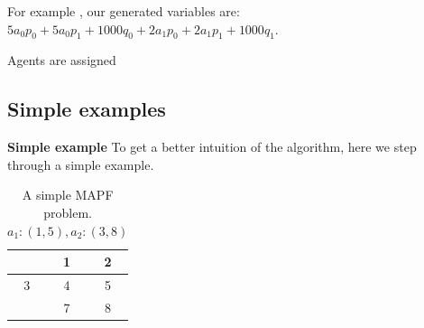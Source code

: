 \documentclass[a4paper,11pt]{article}
\begin{document}
For example \cite{put example!}, our generated variables are: $5a_0p_0 + 5a_0p_1 + 1000q_0 + 2a_1p_0 + 2a_1p_1 + 1000q_1$.

Agents are assigned


\subsection{Simple examples}
\noindent \textbf{Simple example} To get a better intuition of the algorithm, here we step through a simple example.

\begin{table}[h]
	\centering
	\footnotesize
	\begin{tabular}{|c|c|c|}
		\hline
		\cellcolor{black}  & 1 & 2\\ \hline
		3 & 4 & 5 \\ \hline
		\cellcolor{black} & 7 & 8 \\ \hline
	\end{tabular}
	
	\caption{A simple MAPF problem. $a_1: (1, 5), a_2: (3, 8)$}
	\label{fig:simple-step-through-example}
\end{table}
\end{document}
